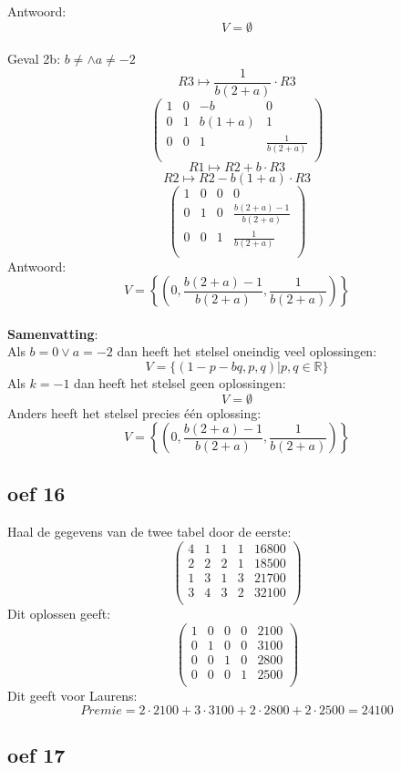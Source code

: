 \documentclass[10pt,a4paper]{article}
\begin{document}
Antwoord:
\[
V=\emptyset
\]\\
Geval 2b: $b\neq \wedge a \neq -2$
\[ R3 \longmapsto \frac{1}{b(2+a)}\cdot R3 \]
\[
\begin{pmatrix}
1 & 0 & -b & 0\\
0 & 1 & b(1+a) & 1\\
0 & 0 & 1 & \frac{1}{b(2+a)}\\
\end{pmatrix}
\]
\[ R1 \longmapsto R2 + b\cdot R3 \]
\[ R2 \longmapsto R2 - b(1+a)\cdot R3 \]
\[
\begin{pmatrix}
1 & 0 & 0 & 0\\
0 & 1 & 0 & \frac{b(2+a)-1}{b(2+a)}\\
0 & 0 & 1 & \frac{1}{b(2+a)}\\
\end{pmatrix}
\]
Antwoord:
\[
V=\left\lbrace\left(0,\frac{b(2+a)-1}{b(2+a)}, \frac{1}{b(2+a)}\right)\right\rbrace
\]\\
\textbf{Samenvatting}:\\
Als  $b=0 \vee a=-2$ dan heeft het stelsel oneindig veel oplossingen:
\[
V = \{ (1-p-bq,p,q) | p,q \in \mathbb{R} \}
\]
Als $k=-1$ dan heeft het stelsel geen oplossingen:
\[
V=\emptyset
\]
Anders heeft het stelsel precies één oplossing:
\[
V=\left\lbrace\left(0,\frac{b(2+a)-1}{b(2+a)}, \frac{1}{b(2+a)}\right)\right\rbrace
\]
\subsection*{oef 16}
Haal de gegevens van de twee tabel door de eerste:
\[
\begin{pmatrix}
4 & 1 & 1 & 1 & 16800\\
2 & 2 & 2 & 1 & 18500\\
1 & 3 & 1 & 3 & 21700\\
3 & 4 & 3 & 2 & 32100\\
\end{pmatrix}
\]
Dit oplossen geeft:
\[
\begin{pmatrix}
1 & 0 & 0 & 0 & 2100\\
0 & 1 & 0 & 0 & 3100\\
0 & 0 & 1 & 0 & 2800\\
0 & 0 & 0 & 1 & 2500\\
\end{pmatrix}
\]
Dit geeft voor Laurens:
\[
Premie = 2\cdot 2100 + 3\cdot 3100 + 2\cdot 2800 + 2\cdot 2500 = 24100
\]
\subsection*{oef 17}
\end{document}
